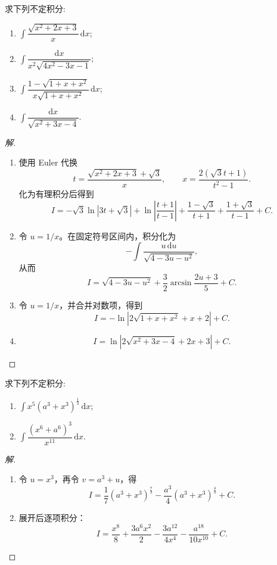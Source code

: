 \documentclass[../../数学分析培优讲义(答案版).tex]{subfiles}
\begin{document}
\begin{example}
求下列不定积分:
\begin{enumerate}[label=(\arabic*)]
    \item $\displaystyle\int\dfrac{\sqrt{x^2+2x+3}}{x}\,\mathrm{d}x$;
    \item $\displaystyle\int\dfrac{\mathrm{d}x}{x^2\sqrt{4x^2-3x-1}}$;
    \item $\displaystyle\int\dfrac{1-\sqrt{1+x+x^2}}{x\sqrt{1+x+x^2}}\,\mathrm{d}x$;
    \item $\displaystyle\int\dfrac{\mathrm{d}x}{\sqrt{x^2+3x-4}}$.
\end{enumerate}
\end{example}

\begin{proof}[解]
\begin{enumerate}[label=(\arabic*)]
    \item 使用 Euler 代换
    \[
        t=\dfrac{\sqrt{x^2+2x+3}+\sqrt3}{x},
        \qquad
        x=\dfrac{2(\sqrt3t+1)}{t^2-1}.
    \]
    化为有理积分后得到
    \[
        I=-\sqrt3\ln|3t+\sqrt3|+\ln\left|\dfrac{t+1}{t-1}\right|
        +\dfrac{1-\sqrt3}{t+1}+\dfrac{1+\sqrt3}{t-1}+C.
    \]
    \item 令 $u=1/x$。在固定符号区间内，积分化为
    \[
        -\int\dfrac{u\,\mathrm{d}u}{\sqrt{4-3u-u^2}},
    \]
    从而
    \[
        I=\sqrt{4-3u-u^2}+\dfrac{3}{2}\arcsin\dfrac{2u+3}{5}+C.
    \]
    \item 令 $u=1/x$，并合并对数项，得到
    \[
        I=-\ln\left|2\sqrt{1+x+x^2}+x+2\right|+C.
    \]
    \item
    \[
        I=\ln\left|2\sqrt{x^2+3x-4}+2x+3\right|+C.
    \]
\end{enumerate}
\end{proof}

\begin{example}
求下列不定积分:
\begin{enumerate}[label=(\arabic*)]
    \item $\displaystyle\int x^5(a^3+x^3)^{\frac{1}{3}}\,\mathrm{d}x$;
    \item $\displaystyle\int\dfrac{(x^6+a^6)^3}{x^{11}}\,\mathrm{d}x$.
\end{enumerate}
\end{example}

\begin{proof}[解]
\begin{enumerate}[label=(\arabic*)]
    \item 令 $u=x^3$，再令 $v=a^3+u$，得
    \[
        I=\dfrac{1}{7}(a^3+x^3)^{\frac{7}{3}}
        -\dfrac{a^3}{4}(a^3+x^3)^{\frac{4}{3}}+C.
    \]
    \item 展开后逐项积分：
    \[
        I=\dfrac{x^8}{8}+\dfrac{3a^6x^2}{2}
        -\dfrac{3a^{12}}{4x^4}-\dfrac{a^{18}}{10x^{10}}+C.
    \]
\end{enumerate}
\end{proof}
\end{document}
